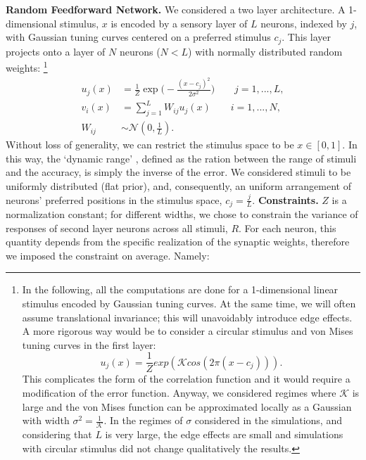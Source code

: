 \documentclass[a4paper]{article}
\begin{document}
\textbf{Random Feedforward Network.} We considered a two layer  architecture. A 1-dimensional stimulus, $x$ is encoded by a sensory layer of $L$ neurons, indexed by $j$, with Gaussian tuning curves centered on a preferred stimulus $c_j$.  This layer  projects onto a layer of $N$ neurons ($N<L$) with normally distributed random weights:
\footnote{In the following, all the computations are done for a 1-dimensional linear stimulus encoded by Gaussian tuning curves. At the same time, we will often assume translational invariance; this will unavoidably introduce edge effects. A more rigorous way would be to consider a circular stimulus and von Mises tuning curves in the first layer:
\begin{equation*}
u_j(x) = \frac{1}{Z} exp(\mathcal{K} cos(2\pi (x-c_j))).
\end{equation*}
This complicates the form of the correlation function and it would require a modification of the error function. Anyway, we considered regimes where $\mathcal{K}$ is large and the von Mises function can be approximated locally as a Gaussian with width $\sigma^2 = \frac{1}{\mathcal{K}}$. In the regimes of $\sigma$ considered in the simulations, and considering that $L$ is very large, the edge effects are small and simulations with circular stimulus did not change qualitatively the results.}
\begin{equation}
\begin{split}
u_j(x) &= \frac{1}{Z} \exp \Big(-\frac{(x-c_j)^2}{2 \sigma^2}\Big)  \qquad  j = 1,...,L, \\
v_i(x) &=\sum_{j=1}^L W_{ij} u_j(x)    \qquad i =1,...,N, \\
 W_{ij} & \sim \mathcal{N}(0,\frac{1}{L}).
\end{split}
\label{Eq:RFFN}
\end{equation}Without loss of generality, we can restrict the stimulus space to be  $x\in[0,1]$. In this way, the `dynamic range' , defined as the ration between the range of stimuli and the accuracy, is simply the inverse of the error. We considered stimuli to be uniformly distributed (flat prior), and, consequently, an uniform arrangement of neurons' preferred positions in the stimulus space, $c_j = \frac{j}{L}$.
\newline
\newline
\textbf{Constraints.} $Z$ is a normalization constant; for different widths, we chose to constrain the variance of responses of second layer neurons across all stimuli, $R$. For each neuron, this quantity depends from the specific realization of the synaptic weights, therefore we imposed the constraint on average. Namely:
\end{document}
